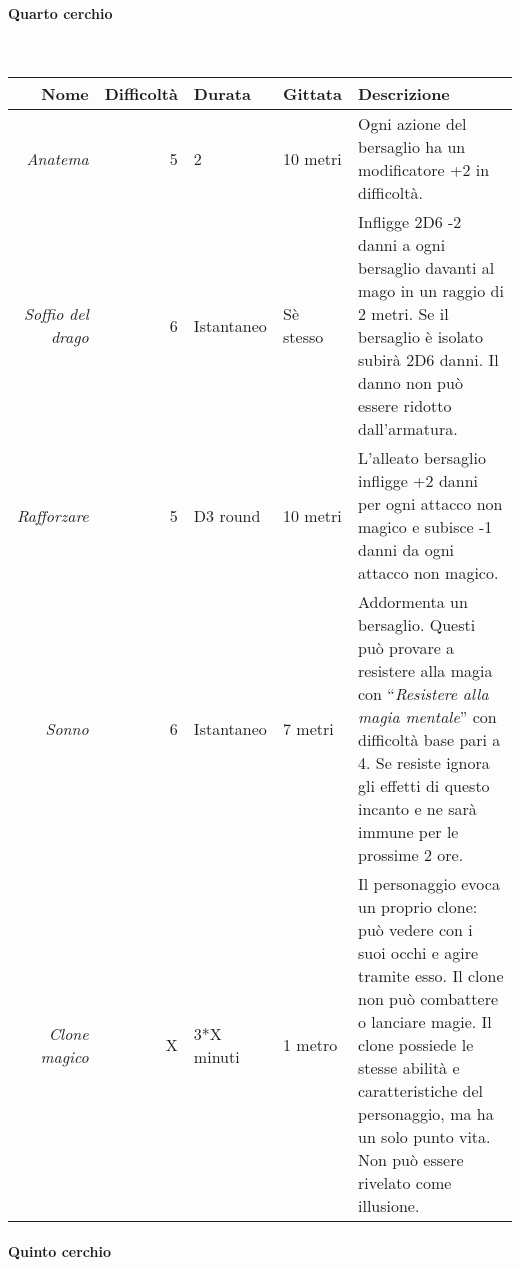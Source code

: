 \documentclass[../manuale_main.tex]{subfiles}
\begin{document}
\paragraph{Quarto cerchio}\mbox{}\\

\begin{tabularx}{\linewidth}{|N| D| T| G| Y|}
\hline
\textbf{Nome} & \textbf{Difficoltà} & \textbf{Durata} & \textbf{Gittata} & \textbf{Descrizione} \\ \hline\hline
\textit{Anatema} & 5 & 2 & 10 metri &Ogni azione del bersaglio ha un modificatore +2 in difficoltà.  \\ \hline
\textit{Soffio del drago} &6  &Istantaneo  & Sè stesso  &Infligge 2D6 -2 danni a ogni bersaglio davanti al mago in un raggio di 2 metri. Se il bersaglio è isolato subirà 2D6 danni. Il danno non può essere ridotto dall'armatura. \\ \hline
\textit{Rafforzare} & 5 & D3 round & 10 metri &L’alleato bersaglio infligge +2 danni per ogni attacco non magico e subisce -1 danni da ogni attacco non magico.  \\ \hline
\textit{Sonno} & 6  & Istantaneo & 7 metri & Addormenta un bersaglio. Questi può provare a resistere alla magia con ``\emph{Resistere alla magia mentale}'' con difficoltà base pari a 4. Se resiste ignora gli effetti di questo incanto e ne sarà immune per le prossime 2 ore.\\ \hline
\textit{Clone magico} & X & 3*X minuti & 1 metro & Il personaggio evoca un proprio clone: può vedere con i suoi occhi e agire tramite esso. Il clone non può combattere o lanciare magie. Il clone possiede le stesse abilità e caratteristiche del personaggio, ma ha un solo punto vita. Non può essere rivelato come illusione.\\
\hline
\end{tabularx}

\paragraph{Quinto cerchio}\mbox{}\\
\end{document}
